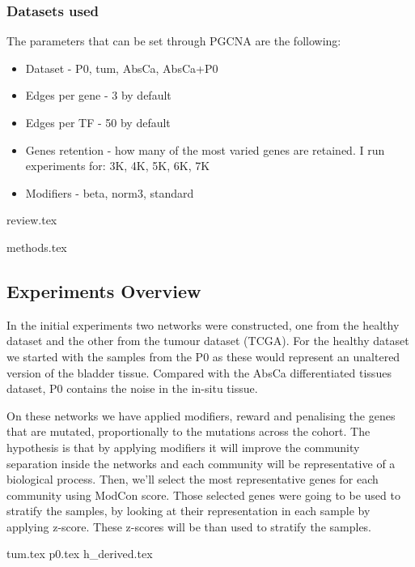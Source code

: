 \subsubsection{Datasets used}


The parameters that can be set through PGCNA are the following:
\begin{itemize}
    \item Dataset - P0, tum, AbsCa, AbsCa+P0
    \item Edges per gene - 3 by default
    \item Edges per TF - 50 by default
    \item Genes retention - how many of the most varied genes are retained. I run experiments for: 3K, 4K, 5K, 6K, 7K
    \item Modifiers - beta, norm3, standard
\end{itemize}


{review.tex}


{methods.tex}

\newpage

\subsection{Experiments Overview}


In the initial experiments two networks were constructed, one from the healthy dataset and the other from the tumour dataset (TCGA). For the healthy dataset we started with the samples from the P0 as these would represent an unaltered version of the bladder tissue. Compared with the AbsCa differentiated tissues dataset, P0 contains the noise in the in-situ tissue.

On these networks we have applied modifiers, reward and penalising the genes that are mutated, proportionally to the mutations across the cohort. The hypothesis is that by applying modifiers it will improve the community separation inside the networks and each community will be representative of a biological process. Then, we'll select the most representative genes for each community using ModCon score. Those selected genes were going to be used to stratify the samples, by looking at their representation in each sample by applying z-score. These z-scores will be than used to stratify the samples.


{tum.tex}
\newpage
{p0.tex}
\newpage
{h_derived.tex}
\newpage

